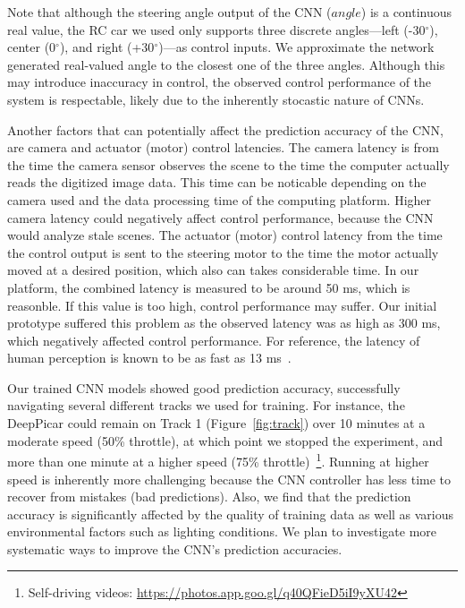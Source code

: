 Note that although the steering angle output of the CNN ($angle$) is
a continuous real value, the RC car we used only supports
three discrete angles---left (-30$^{\circ}$), center 
(0$^{\circ}$), and right (+30$^{\circ}$)---as control inputs.
We approximate the network generated real-valued angle to the closest
one of the three angles. Although this may introduce inaccuracy in
control, the observed control performance of the system is respectable,
likely due to the inherently stocastic nature of CNNs.


Another factors that can potentially affect the prediction accuracy of
the CNN, are camera and actuator (motor) control latencies. The camera
latency is from the time the camera sensor observes the scene to the
time the computer actually reads the digitized image data. This time
can be noticable depending on the camera used and the data processing
time of the computing platform. Higher camera latency could
negatively affect control performance, because the CNN would analyze
stale scenes. The actuator (motor) control latency from the time
the control output is sent to the steering motor to the time the motor
actually moved at a desired position, which also can takes
considerable time. In our platform, the combined latency is measured
to be around 50 ms, which is reasonble.
If this value is too high, control performance may suffer.
Our initial prototype suffered this problem as the observed latency
was as high as 300 ms, which negatively affected control performance.
For reference, the latency of human perception is known to be as fast
as 13 ms~\cite{ThomasBurger2015}. 

Our trained CNN models showed good prediction accuracy, successfully
navigating several different tracks we used for training.
For instance, the DeepPicar could remain on Track 1
(Figure~\ref{fig:track}) over 10 minutes at a moderate speed (50\%
throttle), at which point we stopped the experiment, and more than one
minute at a higher speed (75\% throttle)~\footnote{Self-driving videos: \url{https://photos.app.goo.gl/q40QFieD5iI9yXU42}
}. Running at
higher speed is inherently more challenging because the CNN controller
has less time to recover from mistakes (bad predictions).  Also, we
find that the prediction accuracy is significantly affected by the
quality of training data as well as various environmental factors such
as lighting conditions. We plan to investigate more systematic ways
to improve the CNN's prediction accuracies.

